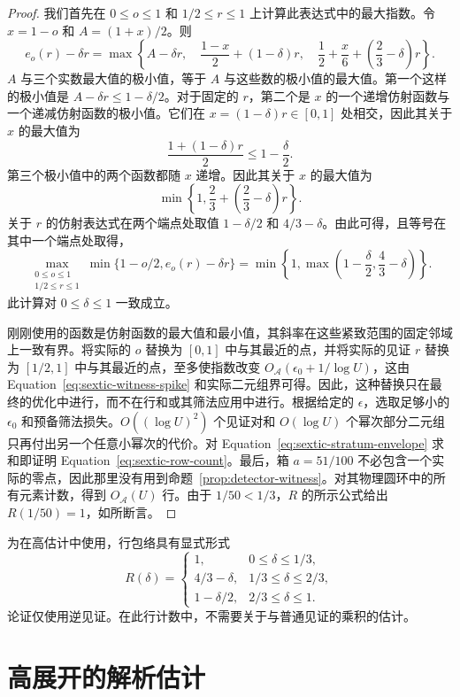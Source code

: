 \documentclass[11pt,a4paper]{article}
\numberwithin{equation}{section}
\numberwithin{figure}{section}
\theoremstyle{definition}
\theoremstyle{remark}
\begin{document}
\begin{proof}
我们首先在 $0\le o\le1$ 和 $1/2\le r\le1$ 上计算此表达式中的最大指数。令 $x=1-o$ 和 $A=(1+x)/2$。则
\[
 e_o(r)-\delta r
 =\max\left\{
 A-\delta r,\quad
 \frac{1-x}{2}+(1-\delta)r,\quad
 \frac12+\frac x6+\left(\frac23-\delta\right)r
 \right\}.
\]
$A$ 与三个实数最大值的极小值，等于 $A$ 与这些数的极小值的最大值。第一个这样的极小值是
$A-\delta r\le1-\delta/2$。对于固定的 $r$，第二个是 $x$ 的一个递增仿射函数与一个递减仿射函数的极小值。它们在
$x=(1-\delta)r\in[0,1]$ 处相交，因此其关于 $x$ 的最大值为
\[
 \frac{1+(1-\delta)r}{2}\le1-\frac\delta2.
\]
第三个极小值中的两个函数都随 $x$ 递增。因此其关于 $x$ 的最大值为
\[
 \min\left\{1,\frac23+\left(\frac23-\delta\right)r\right\}.
\]
关于 $r$ 的仿射表达式在两个端点处取值 $1-\delta/2$ 和
$4/3-\delta$。由此可得，且等号在其中一个端点处取得，
\begin{equation}\label{eq:sextic-envelope-optimization}
 \max_{\substack{0\le o\le1\\1/2\le r\le1}}
 \min\{1-o/2,e_o(r)-\delta r\}
 =\min\left\{1,\max\left(1-\frac\delta2,\frac43-\delta\right)\right\}.
\end{equation}
此计算对 $0\le\delta\le1$ 一致成立。

刚刚使用的函数是仿射函数的最大值和最小值，其斜率在这些紧致范围的固定邻域上一致有界。将实际的 $o$ 替换为 $[0,1]$ 中与其最近的点，并将实际的见证 $r$ 替换为 $[1/2,1]$ 中与其最近的点，至多使指数改变
$O_{\mathcal A}(\epsilon_0+1/\log U)$，这由
Equation~\eqref{eq:sextic-witness-spike} 和实际二元组界可得。因此，这种替换只在最终的优化中进行，而不在行和或其筛法应用中进行。根据给定的 $\epsilon$，选取足够小的 $\epsilon_0$ 和预备筛法损失。$O((\log U)^2)$ 个见证对和 $O(\log U)$ 个幂次部分二元组只再付出另一个任意小幂次的代价。对
Equation~\eqref{eq:sextic-stratum-envelope} 求和即证明
Equation~\eqref{eq:sextic-row-count}。最后，箱 $a=51/100$ 不必包含一个实际的零点，因此那里没有用到命题~\ref{prop:detector-witness}。对其物理圆环中的所有元素计数，得到 $O_{\mathcal A}(U)$ 行。由于 $1/50<1/3$，$R$ 的所示公式给出 $R(1/50)=1$，如所断言。
\end{proof}

为在高估计中使用，行包络具有显式形式
\[
 R(\delta)=
 \begin{cases}
  1,&0\le\delta\le1/3,\\
  4/3-\delta,&1/3\le\delta\le2/3,\\
  1-\delta/2,&2/3\le\delta\le1.
 \end{cases}
\]
论证仅使用逆见证。在此行计数中，不需要关于与普通见证的乘积的估计。

\section{高展开的解析估计}
\label{sec:shared-analytic-estimates}
\end{document}
